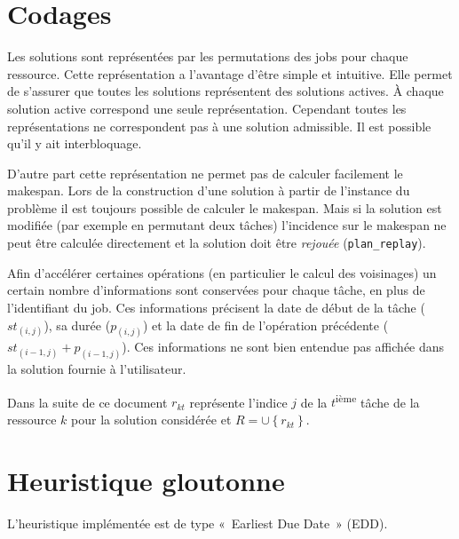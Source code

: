 \documentclass[french]{rapport}
\newcommand{\fun}[1]{\texttt{#1}}
\begin{document}
\section{Codages}

Les solutions sont représentées par les permutations des jobs pour chaque ressource. Cette
représentation a l'avantage d'être simple et intuitive. Elle permet de s'assurer que toutes les
solutions représentent des solutions actives. À chaque solution active correspond une seule
représentation. Cependant toutes les représentations ne correspondent pas à une solution admissible.
Il est possible qu'il y ait interbloquage.

D'autre part cette représentation ne permet pas de calculer facilement le makespan. Lors de la
construction d'une solution à partir de l'instance du problème il est toujours possible de calculer
le makespan. Mais si la solution est modifiée (par exemple en permutant deux tâches) l'incidence sur
le makespan ne peut être calculée directement et la solution doit être \emph{rejouée}
(\fun{plan\_replay}).

\newcommand{\st}{\mathit{st}}

Afin d'accélérer certaines opérations (en particulier le calcul des voisinages) un certain nombre
d'informations sont conservées pour chaque tâche, en plus de l'identifiant du job. Ces informations
précisent la date de début de la tâche ($\st_{(i,j)}$), sa durée ($p_{(i,j)}$) et la date de fin de
l'opération précédente ($\st_{(i-1,j)} + p_{(i-1,j)}$).
Ces informations ne sont bien
entendue pas affichée dans la solution fournie à l'utilisateur.

Dans la suite de ce document $r_{kt}$ représente l'indice $j$ de la $t$\textsuperscript{ième} tâche de la ressource
$k$ pour la solution considérée et $R = \cup{\left\{r_{kt}\right\}}$.


\section{Heuristique gloutonne}

L'heuristique implémentée est de type «~Earliest Due Date~» (EDD).

\newcommand{\sr}{\mathit{sr}}
\newcommand{\so}{\mathit{so}}
\end{document}
